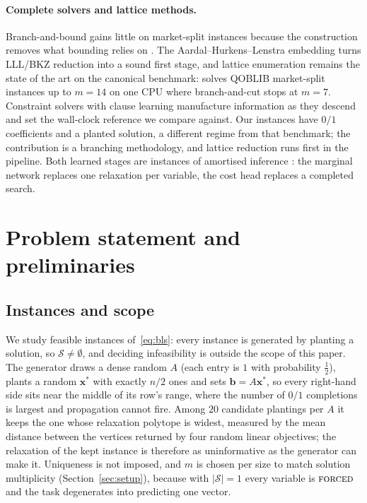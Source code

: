 \documentclass[final,5p,times,twocolumn,authoryear]{elsarticle}
\newcommand{\SOL}{\mathcal{S}}
\newcommand{\FORCED}{\textsc{forced}}
\begin{document}
\paragraph{Complete solvers and lattice methods.} Branch-and-bound gains little on market-split instances because the construction removes what bounding relies on \citep{cornuejols1999class}. The Aardal--Hurkens--Lenstra embedding \citep{aardal2000diophantine,aardal2000market} turns LLL/BKZ reduction \citep{lenstra1982factoring,schnorr1994lattice} into a sound first stage, and lattice enumeration remains the state of the art on the canonical benchmark: \citet{wassermann2025solving} solves QOBLIB market-split instances up to $m=14$ on one CPU where branch-and-cut stops at $m=7$. Constraint solvers with clause learning \citep{marquessilva1999grasp,ohrimenko2009propagation} manufacture information as they descend and set the wall-clock reference we compare against. Our instances have $0/1$ coefficients and a planted solution, a different regime from that benchmark; the contribution is a branching methodology, and lattice reduction runs first in the pipeline. Both learned stages are instances of amortised inference \citep{amos2023tutorial,gershman2014amortized}: the marginal network replaces one relaxation per variable, the cost head replaces a completed search.

\section{Problem statement and preliminaries}
\label{sec:problem}

\subsection{Instances and scope}
\label{sec:problem-instances}

We study feasible instances of~\eqref{eq:bls}: every instance is generated by planting a solution, so $\SOL\neq\emptyset$, and deciding infeasibility is outside the scope of this paper. The generator draws a dense random $A$ (each entry is $1$ with probability $\frac12$), plants a random $\mathbf{x}^\ast$ with exactly $n/2$ ones and sets $\mathbf{b}=A\mathbf{x}^\ast$, so every right-hand side sits near the middle of its row's range, where the number of $0/1$ completions is largest and propagation cannot fire. Among $20$ candidate plantings per $A$ it keeps the one whose relaxation polytope is widest, measured by the mean distance between the vertices returned by four random linear objectives; the relaxation of the kept instance is therefore as uninformative as the generator can make it. Uniqueness is not imposed, and $m$ is chosen per size to match solution multiplicity (Section~\ref{sec:setup}), because with $|\SOL|=1$ every variable is $\FORCED$ and the task degenerates into predicting one vector.
\end{document}
